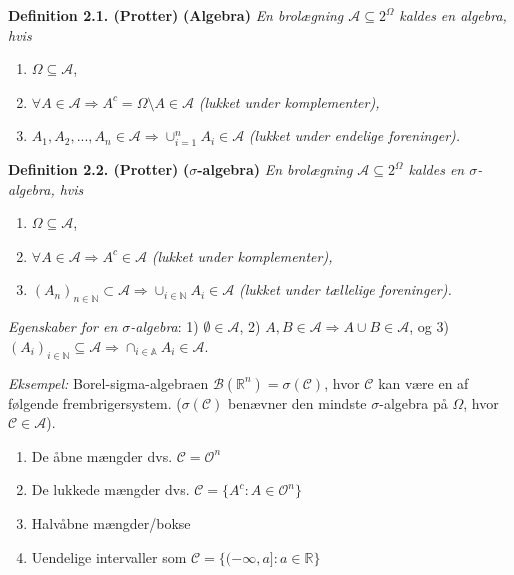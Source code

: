 \documentclass[
]{book}
\providecommand{\tightlist}{%
  \setlength{\itemsep}{0pt}\setlength{\parskip}{0pt}}
\begin{document}
\textbf{Definition 2.1. (Protter)} \textbf{(Algebra)} \emph{En brolægning \(\mathcal{A}\subseteq 2^\Omega\) kaldes en algebra, hvis}

\begin{enumerate}
\def\labelenumi{\arabic{enumi}.}
\tightlist
\item
  \(\Omega\subseteq\mathcal{A}\),
\item
  \(\forall A\in\mathcal{A} \Rightarrow A^c=\Omega\setminus A\in\mathcal{A}\) \emph{(lukket under komplementer),}
\item
  \(A_1,A_2,...,A_n\in\mathcal{A}\Rightarrow \cup_{i=1}^n A_i\in\mathcal{A}\) \emph{(lukket under endelige foreninger).}
\end{enumerate}

\textbf{Definition 2.2. (Protter)} \textbf{(\(\mathit{\sigma}\)-algebra)} \emph{En brolægning \(\mathcal{A}\subseteq 2^\Omega\) kaldes en \(\sigma\)-algebra, hvis}

\begin{enumerate}
\def\labelenumi{\arabic{enumi}.}
\tightlist
\item
  \(\Omega\subseteq\mathcal{A}\),
\item
  \(\forall A\in\mathcal{A} \Rightarrow A^c\in\mathcal{A}\) \emph{(lukket under komplementer),}
\item
  \((A_n)_{n\in\mathbb{N}}\subset\mathcal{A}\Rightarrow \cup_{i\in\mathbb{N}} A_i\in\mathcal{A}\) \emph{(lukket under tællelige foreninger).}
\end{enumerate}

\emph{Egenskaber for en \(\sigma\)-algebra}: 1) \(\emptyset\in\mathcal{A}\), 2) \(A,B\in\mathcal{A}\Rightarrow A \cup B\in\mathcal{A}\), og 3) \((A_i)_{i\in\mathbb{N}}\subseteq\mathcal{A}\Rightarrow\cap_{i\in\mathbb{A}}A_i\in\mathcal{A}\).

\emph{Eksempel:} Borel-sigma-algebraen \(\mathcal{B}(\mathbb{R}^n)=\sigma(\mathcal{C})\), hvor \(\mathcal{C}\) kan være en af følgende frembrigersystem. (\(\sigma(\mathcal{C})\) benævner den mindste \(\sigma\)-algebra på \(\Omega\), hvor \(\mathcal{C}\in\mathcal{A}\)).

\begin{enumerate}
\def\labelenumi{\roman{enumi}.}
\tightlist
\item
  De åbne mængder dvs. \(\mathcal{C}=\mathcal{O}^n\)
\item
  De lukkede mængder dvs. \(\mathcal{C}=\{A^c : A\in\mathcal{O}^n\}\)
\item
  Halvåbne mængder/bokse
\item
  Uendelige intervaller som \(\mathcal{C}=\{(-\infty,a] : a\in\mathbb{R}\}\)
\end{enumerate}
\end{document}

